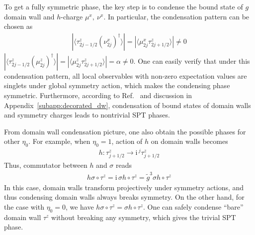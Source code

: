 \documentclass[reprint,amsmath,amssymb,aps,pra,]{revtex4-1}
\newcommand{\ii}{\mathrm{i}\,} %
\newcommand{\dg}{\dagger}
\begin{document}
To get a fully symmetric phase, the key step is to condense the bound state of $g$ domain wall and $h$-charge $\mu^x,~\nu^x$.
In particular, the condensation pattern can be chosen as
\begin{align}
  |\langle\tau_{2j-1/2}^z(\nu^x_{2j})^\dg\rangle|=|\langle\mu_{2j}^x\tau^z_{2j+1/2}\rangle|\neq0
  \label{}
\end{align}
$|\langle\tau^z_{2j-1/2}(\mu^z_{2j})^\dg\rangle|=|\langle\mu^z_{2j}\tau^z_{2j+1/2}\rangle|=\alpha\neq0$.
One can easily verify that under this condensation pattern, all local observables with non-zero expectation values are singlets under global symmetry action, which makes the condensing phase symmetric.
Furthermore, according to Ref.~ and discussion in Appendix~\ref{subapp:decorated_dw}, condensation of bound states of domain walls and symmetry charges leads to nontrivial SPT phases.

From domain wall condensation picture, one also obtain the possible phases for other $\eta_0$.
For example, when $\eta_0=1$, action of $h$ on domain walls becomes
\begin{align}
  h:\tau^z_{j+1/2}\rightarrow \ii^j\tau^z_{j+1/2}
  \label{}
\end{align}
Thus, commutator between $h$ and $\sigma$ reads
\begin{align}
  h\sigma\circ\tau^z=\ii\sigma h\circ\tau^z=\widetilde{g}^3\sigma h\circ\tau^z
  \label{}
\end{align}
In this case, domain walls transform projectively under symmetry actions, and thus condensing domain walls always breaks symmetry.
On the other hand, for the case with $\eta_0=0$, we have $h\sigma\circ\tau^z=\sigma h\circ\tau^z$.
One can safely condense ``bare'' domain wall $\tau^z$ without breaking any symmetry, which gives the trivial SPT phase.
\end{document}
